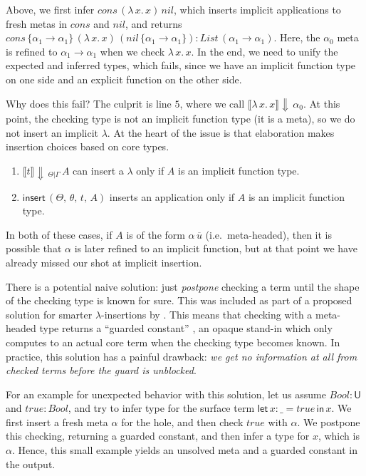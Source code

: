 \documentclass[acmsmall,review,anonymous,prologue,dvipsnames]{acmart}\settopmatter{printfolios=true,printccs=false,printacmref=false}
\newcommand{\slet}{\boldsymbol{\mathsf{let}}}
\renewcommand{\sin}{\boldsymbol{\mathsf{in}}}
\renewcommand{\U}{\mathsf{U}}
\newcommand{\mi}[1]{\mathit{#1}}
\newcommand{\echeck}[4]{\llbracket#1\rrbracket\!\Downarrow\,_{#2|#3}\,#4}
\newcommand{\echeckt}[2]{\llbracket#1\rrbracket\!\Downarrow\,#2}
\newcommand{\einsert}{\mathsf{insert}}
\theoremstyle{remark}
\begin{document}
Above, we first infer $\mi{cons}\,(\lambda\,x.\,x)\,\mi{nil}$, which inserts implicit
applications to fresh metas in $cons$ and $nil$, and returns $cons\,\{\alpha_1
\to \alpha_1\}\,(\lambda\,x.\,x)\,(\mi{nil}\,\{\alpha_1\to\alpha_1\}) :
\mi{List}\,(\alpha_1\to\alpha_1)$. Here, the $\alpha_0$ meta is refined to $\alpha_1
\to \alpha_1$ when we check $\lambda\,x.\,x$. In the end, we need to unify the
expected and inferred types, which fails, since we have an implicit function
type on one side and an explicit function on the other side.

Why does this fail? The culprit is line $\scriptstyle{5}$, where we call
$\echeckt{\lambda\,x.\,x}{\alpha_0}$. At this point, the checking type is not an
implicit function type (it is a meta), so we do not insert an implicit
$\lambda$. At the heart of the issue is that elaboration makes insertion choices
based on core types.
\begin{enumerate}
\item $\echeck{t}{\Theta}{\Gamma}{A}$ can insert a $\lambda$ only if $A$ is an implicit function type.
\item $\einsert\,(\Theta,\,\theta,\,t,\,A)$ inserts an application only if $A$ is an implicit function type.
\end{enumerate}
In both of these cases, if $A$ is of the form $\alpha\,\overline{u}$
(i.e.\ meta-headed), then it is possible that $\alpha$ is later refined to an
implicit function, but at that point we have already missed our shot at implicit
insertion.

There is a potential naive solution: just \emph{postpone} checking a term until
the shape of the checking type is known for sure. This was included as part of a
proposed solution for smarter $\lambda$-insertions by
\cite{johansson2015eliminating}. This means that checking with a meta-headed
type returns a ``guarded constant'' \cite[Chapter~3]{norell07thesis}, an opaque
stand-in which only computes to an actual core term when the checking type
becomes known. In practice, this solution has a painful drawback: \emph{we get
  no information at all from checked terms before the guard is unblocked}.

For an example for unexpected behavior with this solution, let us assume $\mi{Bool} :
\U$ and $\mi{true} : \mi{Bool}$, and try to infer type for the surface term $\slet\,x : \_
= \mi{true}\,\sin\, x$. We first insert a fresh meta $\alpha$ for the hole, and then
check $\mi{true}$ with $\alpha$. We postpone this checking, returning a guarded
constant, and then infer a type for $x$, which is $\alpha$. Hence, this small
example yields an unsolved meta and a guarded constant in the output.
\end{document}
